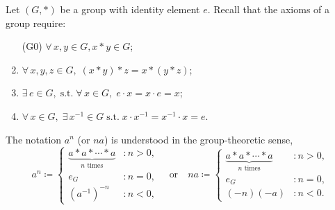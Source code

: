 \documentclass[11pt,openany]{article}
\begin{document}
\begin{note}
Let \( (G, \ast) \) be a group with identity element \( e \). Recall that the axioms of a group require:
\begin{enumerate}[(G1)]
	\item[(G0)] $\forall\, x, y \in G,  x \ast y\in G$;
	\item $\forall\, x, y, z \in G,\;  (x \ast y) \ast z = x \ast (y\ast z)$;
	\item $\exists\, e \in G,\; \text{s.t.}\; \forall\, x \in G,\; e \cdot x = x \cdot e = x$;
	\item $\forall\, x \in G,\; \exists\, x^{-1} \in G\; \text{s.t.}\; x \cdot x^{-1} = x^{-1} \cdot x = e$.
\end{enumerate}
\end{note}
\begin{remark*}
	The notation \(a^n\) (or $na$) is understood in the group-theoretic sense, \[
	a^n \coloneqq
	\begin{cases}
		\underbrace{a \ast a \ast \cdots \ast a}_{n \text{ times}} &: n > 0, \\
		e_G &: n = 0, \\
		(a^{-1})^{-n}&: n < 0,
	\end{cases}\quad\text{or}\quad	
na \coloneqq
\begin{cases}
\underbrace{a \ast a \ast \cdots \ast a}_{n \text{ times}} &: n > 0, \\
e_G &: n = 0, \\
(-n)(-a)&: n < 0.
\end{cases}
\]
\end{remark*}
\end{document}
